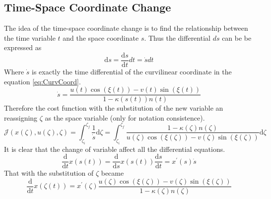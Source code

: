\subsection{Time-Space Coordinate Change}
\label{subsec:T2S}
%
The idea of the time-space coordinate change is to find the relationship between the time variable $t$ and the space coordinate $s$. Thus the differential $ds$ can be be expressed as
%
\begin{equation}
    \mathrm{d} s =  \frac{\mathrm{d}s}{\mathrm{d}t} dt = \dot{s} dt
\end{equation}
%
Where $\dot{s}$ is exactly the time differential of the curvilinear coordinate in the equation \ref{eq:CurvCoord}.
%
\begin{equation}
    \dot{s} = \frac{u(t) \cos(\xi(t)) - v(t) \sin(\xi(t))}{1-\kappa(s(t)) n(t)}
\end{equation}
%
Therefore the cost function with the substitution of the new variable an reassigning $\zeta$ as the space variable (only for notation consistence).
% 
\begin{equation}
    \mathcal{J}(x(\zeta), u(\zeta), \zeta) = \int_{\zeta_i}^{\zeta_f} \frac{1}{\dot{s}} \mathrm{d}\zeta = \int_{\zeta_i}^{\zeta_f} \frac{1-\kappa(\zeta) n(\zeta)}{u(\zeta) \cos(\xi(\zeta)) - v(\zeta) \sin(\xi(\zeta))} \mathrm{d}\zeta
\end{equation}
%
It is clear that the change of variable affect all the differential equations.
%
\begin{equation}
    \frac{\mathrm{d}}{\mathrm{d}t} x(s(t)) = \frac{\mathrm{d}}{\mathrm{d}s} x(s(t)) \frac{\mathrm{d} s}{\mathrm{d}t} = x^\prime(s) \dot{s}
\end{equation}
%
That with the substitution of $\zeta$ became
%
\begin{equation}
    \frac{\mathrm{d}}{\mathrm{d}t} x(\zeta(t)) = x^\prime(\zeta) \frac{u(\zeta) \cos(\xi(\zeta)) - v(\zeta) \sin(\xi(\zeta))}{1-\kappa(\zeta) n(\zeta)}
\end{equation}
%